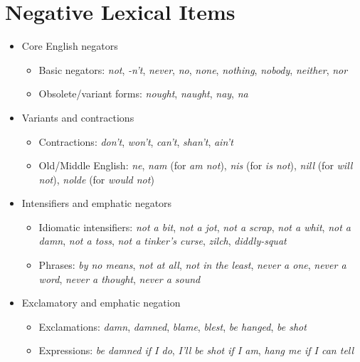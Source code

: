 \chapter{Negative Lexical Items} \label{ch:lexical}

\largerpage
\begin{itemize}[leftmargin=*]
    \item {Core English negators}
    \begin{itemize}
        \item Basic negators: \textit{not}, \textit{-n't}, \textit{never}, \textit{no}, \textit{none}, \textit{nothing}, \textit{nobody}, \textit{neither}, \textit{nor}
        \item Obsolete/variant forms: \textit{nought}, \textit{naught}, \textit{nay}, \textit{na}
    \end{itemize}

    \item {Variants and contractions}
    \begin{itemize}
        \item Contractions: \textit{don’t}, \textit{won’t}, \textit{can’t}, \textit{shan’t}, \textit{ain’t}
        \item Old/Middle English: \textit{ne}, \textit{nam} (for \textit{am not}), \textit{nis} (for \textit{is not}), \textit{nill} (for \textit{will not}), \textit{nolde} (for \textit{would not})
    \end{itemize}

    \item {Intensifiers and emphatic negators}
    \begin{itemize}
        \item Idiomatic intensifiers: \textit{not a bit}, \textit{not a jot}, \textit{not a scrap}, \textit{not a whit}, \textit{not a damn}, \textit{not a toss}, \textit{not a tinker’s curse}, \textit{zilch}, \textit{diddly-squat}
        \item Phrases: \textit{by no means}, \textit{not at all}, \textit{not in the least}, \textit{never a one}, \textit{never a word}, \textit{never a thought}, \textit{never a sound}
    \end{itemize}

    \item {Exclamatory and emphatic negation}
    \begin{itemize}
        \item Exclamations: \textit{damn}, \textit{damned}, \textit{blame}, \textit{blest}, \textit{be hanged}, \textit{be shot}
        \item Expressions: \textit{be damned if I do}, \textit{I’ll be shot if I am}, \textit{hang me if I can tell}
    \end{itemize}


\end{itemize}
